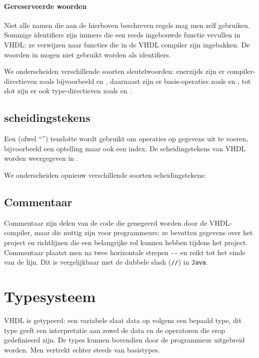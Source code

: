 \paragraph{Gereserveerde woorden}Niet alle namen die aan de hierboven beschreven regels mag men zelf gebruiken. Sommige identifiers zijn immers  die een reeds ingebouwde functie vevullen in VHDL: ze verwijzen naar functies die in de VHDL compiler zijn ingebakken. De woorden in  mogen niet gebruikt worden als identifiers.


We onderscheiden verschillende soorten sleutelwoorden: enerzijds zijn er compiler-directieven zoals bijvoorbeeld  en , daarnaast zijn er basis-operaties zoals  en , tot slot zijn er ook type-directieven zoals  en .

\subsection{scheidingstekens}
Een  (ofwel ``'') tenslotte wordt gebruikt om operaties op gegevens uit te voeren, bijvoorbeeld een optelling maar ook een index. De
scheidingstekens van VHDL worden weergegeven in .


We onderscheiden opnieuw verschillende soorten scheidingstekens: 

\subsection{Commentaar}
Commentaar zijn delen van de code die genegeerd worden door de VHDL-compiler, maar die nuttig zijn voor programmeurs: ze bevatten gegevens over het project en richtlijnen die een belangrijke rol kunnen hebben tijdens het project. Commentaar plaatst men na twee horizontale strepen \verb+--+ en reikt tot het einde van de lijn. Dit is vergelijkbaar met de dubbele slash (\verb+//+) in \texttt{Java}.

\section{Typesysteem}
VHDL is getypeerd: een variabele slaat data op volgens een bepaald type, dit type geeft een interpretatie aan zowel de data en de operatoren die erop gedefinieerd zijn. De types kunnen bovendien door de programmeur uitgebreid worden. Men vertrekt echter steeds van basistypes.

